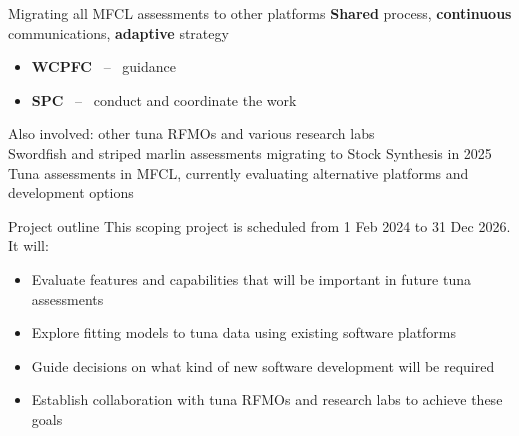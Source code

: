 \documentclass[aspectratio=169,fleqn]{beamer}
\begin{document}

\begin{frame}{Migrating all MFCL assessments to other platforms}
  \textbf{\darkgreen Shared} process, {\darkgreen\bf continuous} communications,
  {\darkgreen\bf adaptive} strategy\\[2ex]
  \begin{itemize}
    \item[] {\blue\bf WCPFC} ~--~ guidance\\[2ex]
    \item[] {\blue\bf SPC} ~--~ conduct and coordinate the work\\[3ex]
  \end{itemize}
  Also involved: other tuna RFMOs and various research labs\\[4ex]
  Swordfish and striped marlin assessments migrating to Stock Synthesis in
  2025\\[4ex]
  Tuna assessments in MFCL, currently evaluating alternative platforms and\\
  development options\\[1ex]
\end{frame}


\begin{frame}{Project outline}
  This scoping project is scheduled from 1 Feb 2024 to 31 Dec 2026. It
  will:\\[3ex]
  \begin{itemize}
    \item[] Evaluate features and capabilities that will be important in future
    tuna assessments\\[3ex]
    \item[] Explore fitting models to tuna data using existing software
    platforms\\[3ex]
    \item[] Guide decisions on what kind of new software development will be
    required\\[3ex]
    \item[] Establish collaboration with tuna RFMOs and research labs to achieve
    these goals\\[3ex]
  \end{itemize}
\end{frame}

\end{document}
